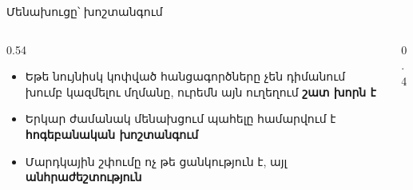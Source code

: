 \begin{frame}{Մենախուցը՝ խոշտանգում}
  \begin{columns}[c]
    \begin{column}{0.54\textwidth}
      \begin{itemize}
        \item Եթե նույնիսկ կոփված հանցագործները չեն դիմանում խումբ կազմելու մղմանը, ուրեմն այն ուղեղում \textbf{շատ խորն է}
        \item<2-> Երկար ժամանակ մենախցում պահելը համարվում է \textbf{հոգեբանական խոշտանգում}
        \item<3-> Մարդկային շփումը ոչ թե ցանկություն է, այլ \textbf{անհրաժեշտություն}
      \end{itemize}
    \end{column}
    \begin{column}{0.4\textwidth}
      \centering
      \par\medskip
    \end{column}
  \end{columns}
\end{frame}

